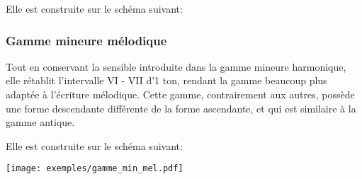 \documentclass[11pt,a4paper]{scrreprt}
\begin{document}
Elle est construite sur le schéma suivant: 
\begin{center}
\end{center}

\subsubsection{Gamme mineure mélodique}
Tout en conservant la sensible introduite dans la gamme mineure harmonique, elle rétablit l'intervalle VI - VII d'1 ton, rendant la gamme beaucoup plus adaptée à l'écriture mélodique. Cette gamme, contrairement aux autres, possède une forme descendante différente de la forme ascendante, et qui est similaire à la gamme antique.

Elle est construite sur le schéma suivant: 
\begin{center}
\end{center}
\begin{center}
   \texttt{[image: exemples/gamme\_min\_mel.pdf]}
\end{center}

\begin{center}
\end{center}
\end{document}
